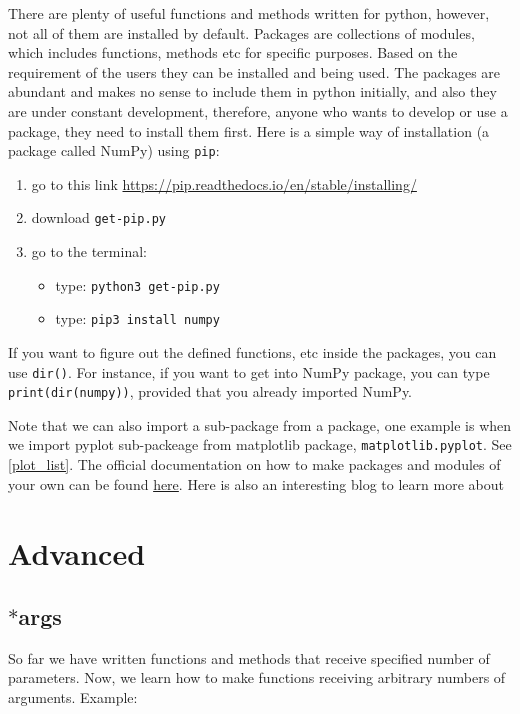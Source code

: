 \documentclass[10pt,a4paper]{article}
\begin{document}
There are plenty of useful functions and methods written for python, however, not all of them are installed by default. Packages are collections of modules, which includes functions, methods etc for specific purposes.  Based on the requirement of the users they can be installed and being used. The packages are abundant and makes no sense to include them in python initially, and also they are under constant development, therefore, anyone who wants to develop or use a package, they need to install them first. Here is a simple way of installation (a package called NumPy)  using \texttt{pip}:
\begin{enumerate}
\item go to this link \href{https://pip.readthedocs.io/en/stable/installing/}{https://pip.readthedocs.io/en/stable/installing/}
\item download \texttt{get-pip.py}
\item go to the terminal:
\begin{itemize}
\item type: \texttt{python3 get-pip.py}
\item type: \texttt{pip3 install numpy}
\end{itemize}
\end{enumerate}
If you want to figure out the defined functions, etc inside the packages, you can use \texttt{dir()}. For instance, if you want to get into NumPy package, you can type \texttt{print(dir(numpy))}, provided that you already imported NumPy. 




Note that we can also import a sub-package from a package, one example is when we import pyplot sub-packeage from matplotlib package,  \texttt{matplotlib.pyplot}. See \ref{plot_list}.
The official documentation on how to make packages and modules of your own can be found \href{https://docs.python.org/3/tutorial/modules.html}{here}. Here is also an interesting blog to learn more about 





\section{Advanced}
\subsection{$\ast$args}
So far we have written functions and methods that receive specified number of parameters. Now, we learn how to make functions receiving arbitrary numbers of arguments. Example:

\end{document}
